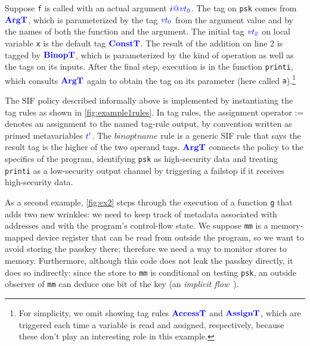 \documentclass{llncs}
\begin{document}
Suppose {\tt f} is called with an actual argument \(i\tagat \vt[_0]\).
The tag on {\tt psk} comes from \(\argtname\), which is parameterized by the tag \(\vt[_0]\) from the argument
value and by the names of both the function
and the argument. The initial tag \(\vt[_2]\) on local
variable {\tt x} is the default tag \(\consttname\).
The result of the addition on line 2 is tagged by \(\binoptname\), which is parameterized
by the kind of operation as well as the tags on its inputs.
After the final step, execution is in the function {\tt printi}, which consults
\(\argtname\) again to obtain the tag on its parameter (here called {\tt a}).\footnote{
For simplicity, we omit showing tag rules \(\accesstname\) and \(\assigntname\), 
which are triggered each time a variable is read and assigned, respectively, because these
don't play an interesting role in this example.}

The SIF policy described informally above is implemented by instantiating the
tag rules as shown in \cref{fig:example1rules}. 
In tag rules,
the assignment operator := denotes an assignment to the named tag-rule output, by convention
written as primed metavariables \(\gentag[']\).  The \(binoptname\) rule is a
generic SIF rule that says the result tag is the higher of the two operand tags. 
\(\argtname\) connects the policy to the specifics of the program, identifying {\tt psk}
as high-security data and treating {\tt printi} as a low-security output channel by
triggering a failstop if it receives high-security data.

As a second example, \cref{fig:ex2} steps through the execution of a function {\tt g} that adds two new wrinkles:
we need to keep track of metadata associated with
addresses and with the program's control-flow state. We suppose {\tt mm} is
a memory-mapped device register that can be read from outside the program, so we want to avoid storing the passkey there;
therefore we need a way to monitor stores to memory.  Furthermore, although this code does not leak the passkey directly,
it does so indirectly: since the store to {\tt mm} is conditional on testing {\tt psk},
an outside observer of {\tt mm} can deduce one bit of the key (an {\em implicit flow}~\cite{Denning76:SFIlattice}).
\end{document}
